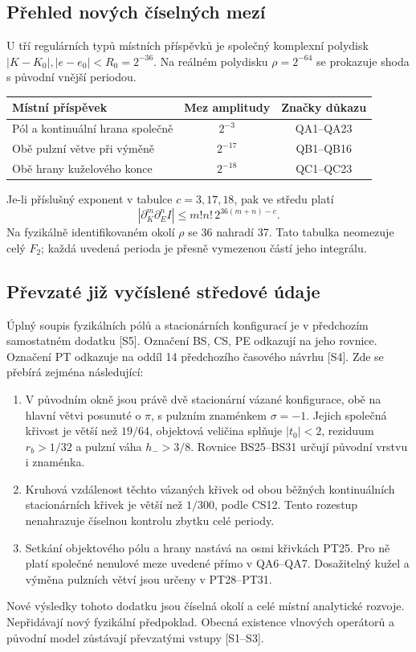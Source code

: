 \documentclass[11pt,a4paper]{article}
\theoremstyle{remark}\newtheorem{remark}[theorem]{Poznámka}
\numberwithin{equation}{section}
\begin{document}
\subsection{Přehled nových číselných mezí}

U tří regulárních typů místních příspěvků je společný
komplexní polydisk \(|K-K_0|,|e-e_0|<R_0=2^{-36}\).
Na reálném polydisku \(\rho=2^{-64}\) se prokazuje
shoda s původní vnější periodou.

\begin{center}
\begin{tabular}{p{65mm}cc}
\toprule
Místní příspěvek & Mez amplitudy & Značky důkazu\\
\midrule
Pól a kontinuální hrana společně & \(2^{-3}\) & QA1--QA23\\
Obě pulzní větve při výměně & \(2^{-17}\) & QB1--QB16\\
Obě hrany kuželového konce & \(2^{-18}\) & QC1--QC23\\
\bottomrule
\end{tabular}
\end{center}

Je-li příslušný exponent v tabulce \(c=3,17,18\), pak
ve středu platí
\[
|\partial_K^m\partial_E^n I|\le m!n!\,2^{36(m+n)-c}.
\]
Na fyzikálně identifikovaném okolí \(\rho\) se 36 nahradí 37.
Tato tabulka neomezuje celý \(F_2\); každá uvedená perioda
je přesně vymezenou částí jeho integrálu.

\subsection{Převzaté již vyčíslené středové údaje}

Úplný soupis fyzikálních pólů a stacionárních konfigurací
je v předchozím samostatném dodatku [S5]. Označení BS, CS,
PE odkazují na jeho rovnice. Označení PT odkazuje na
oddíl 14 předchozího časového návrhu [S4]. Zde se přebírá
zejména následující:
\begin{enumerate}
\item V původním okně jsou právě dvě stacionární vázané
konfigurace, obě na hlavní větvi posunuté o \(\pi\),
s pulzním znaménkem \(\sigma=-1\). Jejich společná
křivost je větší než \(19/64\), objektová veličina
splňuje \(|t_0|<2\), reziduum \(r_b>1/32\) a pulzní
váha \(h_->3/8\). Rovnice BS25--BS31 určují původní
vrstvu i znaménka.
\item Kruhová vzdálenost těchto vázaných křivek od obou
běžných kontinuálních stacionárních křivek je větší
než \(1/300\), podle CS12. Tento rozestup nenahrazuje
číselnou kontrolu zbytku celé periody.
\item Setkání objektového pólu a hrany nastává na osmi
křivkách PT25. Pro ně platí společné nenulové meze
uvedené přímo v QA6--QA7. Dosažitelný kužel a výměna
pulzních větví jsou určeny v PT28--PT31.
\end{enumerate}
Nové výsledky tohoto dodatku jsou číselná okolí a celé
místní analytické rozvoje. Nepřidávají nový fyzikální
předpoklad. Obecná existence vlnových operátorů a původní
model zůstávají převzatými vstupy [S1--S3].
\end{document}
